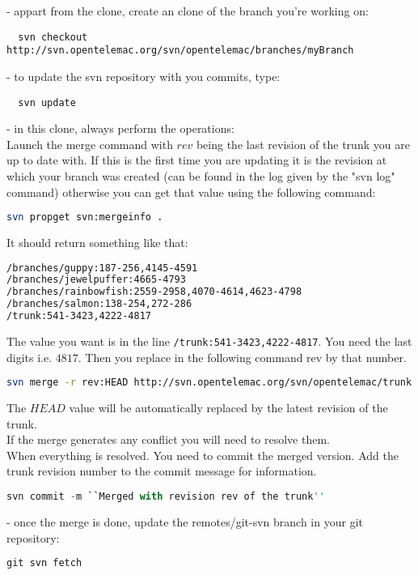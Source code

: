 - appart from the  clone, create an  clone of the branch you're working on:\\
\begin{lstlisting}
  svn checkout http://svn.opentelemac.org/svn/opentelemac/branches/myBranch
\end{lstlisting}
- to update the svn repository with you  commits, type:
\begin{lstlisting}
  svn update
\end{lstlisting}
- in this  clone, always perform the  operations: \\
Launch the merge command with $rev$ being the last revision of the trunk
you are up to date with. If this is the first time you are updating it is the
revision at which your branch was created (can be found in the log given by the
"svn log" command) otherwise you can get that value using the following
command:
\begin{lstlisting}[language=bash]
  svn propget svn:mergeinfo .
\end{lstlisting}
It should return something like that:
\begin{lstlisting}[language=bash]
/branches/guppy:187-256,4145-4591
/branches/jewelpuffer:4665-4793
/branches/rainbowfish:2559-2958,4070-4614,4623-4798
/branches/salmon:138-254,272-286
/trunk:541-3423,4222-4817
\end{lstlisting}
The value you want is in the line \verb+/trunk:541-3423,4222-4817+. You need
the last digits i.e. $4817$.  Then you replace in the following command rev by
that number.
\begin{lstlisting}[language=bash]
  svn merge -r rev:HEAD http://svn.opentelemac.org/svn/opentelemac/trunk .
\end{lstlisting}
The $HEAD$ value will be automatically replaced by the latest revision of the
trunk.\\
If the merge generates any conflict you will need to resolve them.\\
When everything is resolved. You need to commit the merged version. Add
the trunk revision number to the commit message for information.
\begin{lstlisting}[language=python]
  svn commit -m ``Merged with revision rev of the trunk''
\end{lstlisting}
- once the merge is done, update the remotes/git-svn branch in your git repository:
\begin{lstlisting}[language=python]
  git svn fetch
\end{lstlisting}

